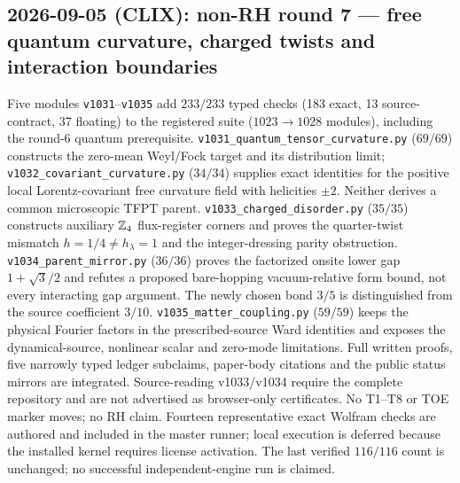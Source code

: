 \subsection*{2026-09-05 (CLIX): non-RH round 7 --- free quantum curvature, charged twists and interaction boundaries}
Five modules \texttt{v1031}--\texttt{v1035} add $233/233$ typed checks
(183 exact, 13 source-contract, 37 floating) to the registered suite
($1023\to1028$ modules), including the round-6 quantum prerequisite.
\texttt{v1031\_quantum\_tensor\_curvature.py} ($69/69$) constructs the
zero-mean Weyl/Fock target and its distribution limit;
\texttt{v1032\_covariant\_curvature.py} ($34/34$) supplies exact
identities for the positive local Lorentz-covariant free curvature field
with helicities $\pm2$. Neither derives a common microscopic TFPT parent.
\texttt{v1033\_charged\_disorder.py} ($35/35$) constructs auxiliary
$\mathbb{Z}_4$ flux-register corners and proves the quarter-twist mismatch
$h=1/4\ne h_\lambda=1$ and the integer-dressing parity obstruction.
\texttt{v1034\_parent\_mirror.py} ($36/36$) proves the factorized
onsite lower gap $1+\sqrt3/2$ and refutes a proposed bare-hopping
vacuum-relative form bound, not every interacting gap argument. The
newly chosen bond $3/5$ is distinguished from the source coefficient $3/10$.
\texttt{v1035\_matter\_coupling.py} ($59/59$) keeps the physical
Fourier factors in the prescribed-source Ward identities and exposes
the dynamical-source, nonlinear scalar and zero-mode limitations.
Full written proofs, five narrowly typed ledger subclaims, paper-body
citations and the public status mirrors are integrated. Source-reading
v1033/v1034 require the complete repository and are not advertised as
browser-only certificates. No T1--T8 or TOE marker moves; no RH claim.
Fourteen representative exact Wolfram checks are authored and included in
the master runner; local execution is deferred because the installed
kernel requires license activation. The last verified $116/116$ count
is unchanged; no successful independent-engine run is claimed.

